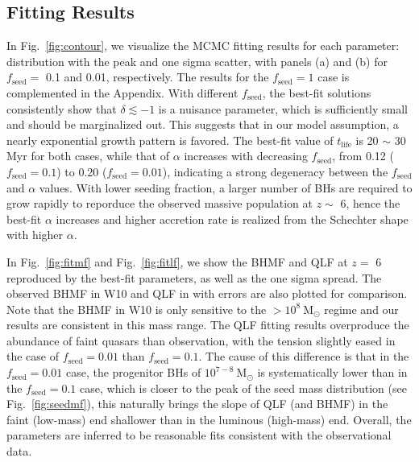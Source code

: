 \documentclass[twocolumn, twocolappendix]{aastex63}
\newcommand{\Msun}{\mathrm{M_\odot}}
\newcommand{\tlife}{t_\mathrm{life}}
\newcommand{\fseed}{f_\mathrm{seed}}
\begin{document}
\begin{CJK*}{UTF8}{gbsn}
\vspace{2mm}
\subsection{Fitting Results}\label{sec:fitting_result}
In Fig.~\ref{fig:contour}, we visualize the MCMC fitting results for each parameter: distribution with the peak and one sigma scatter, 
with panels (a) and (b) for $\fseed=$ 0.1 and 0.01, respectively. 
The results for the $\fseed=1$ case is complemented in the Appendix.
With different $\fseed$, the best-fit solutions consistently show that $\delta \lesssim -1$ is a nuisance parameter, 
which is sufficiently small and should be marginalized out. This suggests that in our model assumption, 
a nearly exponential growth pattern is favored. 
The best-fit value of $\tlife$ is 20 $\sim$ 30 Myr for both cases, 
while that of $\alpha$ increases with decreasing $\fseed$, 
from 0.12 ($\fseed=0.1$) to 0.20 ($\fseed=0.01$),
indicating a strong degeneracy between the $\fseed$ and $\alpha$ values. 
With lower seeding fraction, a larger number of BHs are required to grow rapidly to reporduce the observed massive population at $z\sim$ 6, 
hence the best-fit $\alpha$ increases and higher accretion rate is realized from the Schechter shape with higher $\alpha$. 

In Fig.~\ref{fig:fitmf} and Fig.~\ref{fig:fitlf}, we show the BHMF and QLF at $z=$ 6 reproduced by the best-fit parameters, 
as well as the one sigma spread. 
The observed BHMF in W10 and QLF in \citet{2018ApJ...869..150M} with errors are also plotted for comparison.
Note that the BHMF in W10 is only sensitive to the $>10^8~\Msun$ regime and our results are consistent in this mass range.
The QLF fitting results overproduce the abundance of faint quasars than observation, 
with the tension slightly eased in the case of $\fseed=0.01$ than $\fseed=0.1$. 
The cause of this difference is that in the $\fseed=0.01$ case, 
the progenitor BHs of $10^{7-8}~\Msun$ is systematically lower than in the $\fseed=0.1$ case, 
which is closer to the peak of the seed mass distribution (see Fig.~\ref{fig:seedmf}), 
this naturally brings the slope of QLF (and BHMF) in the faint (low-mass) end shallower than in the luminous (high-mass) end.
Overall, the parameters are inferred to be reasonable fits consistent with the observational data.


\end{CJK*}
\end{document}
